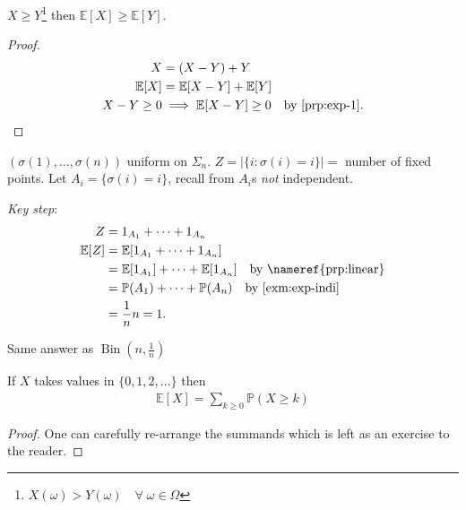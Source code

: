 \begin{corollary}
    $X \geq Y$\footnote{$X(\omega) > Y(\omega) \quad \forall \; \omega \in \Omega$} then $\mathbb{E}[X] \geq \mathbb{E}[Y]$.
\end{corollary} 

\begin{proof}
    \begin{align*}
        X &= (X - Y) + Y \\
        \mathbb{E}[X] &= \mathbb{E}[X - Y] + \mathbb{E}[Y] \\
        X - Y \geq 0 &\implies \mathbb{E}[X - Y] \geq 0 \quad \text{by \Cref{prp:exp-1}}.
    \end{align*} 
\end{proof} 

\begin{example}
    $(\sigma(1), \dots, \sigma(n))$ uniform on $\Sigma_n$.
    $Z = |\{i : \sigma(i) = i\}| =$ number of fixed points.
    Let $A_i = \{\sigma(i) = i\}$, \color{blue} recall from  $A_i$s \emph{not} independent. \color{black}

    \emph{Key step}:
    \begin{align*}
        Z &= 1_{A_1} + \dots + 1_{A_n} \\
        \mathbb{E}[Z] &= \mathbb{E}[1_{A_1} + \dots + 1_{A_n}] \\
        &= \mathbb{E}[1_{A_1}] + \dots + \mathbb{E}[1_{A_n}] \quad \text{by \nameref{prp:linear}} \\
        &= \mathbb{P}(A_1) + \dots + \mathbb{P}(A_n) \quad \text{by \Cref{exm:exp-indi}}\\
        &= \frac{1}{n} n = 1.
    \end{align*}
\end{example}

\begin{note}
    Same answer as $\operatorname{Bin}(n, \frac{1}{n})$
\end{note} 

\begin{proposition}
    If $X$ takes values in $\{0, 1, 2, \dots\}$ then
    \begin{align*}
        \mathbb{E}[X] = \sum_{k \geq 0} \mathbb{P}(X \geq k)
    \end{align*} 
\end{proposition} 

\begin{proof}
    One can carefully re-arrange the summands which is left as an exercise to the reader.
\end{proof} 

